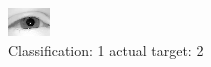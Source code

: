 \begin{figure}[h!]
\begin{center}
\includegraphics[width=0.60\columnwidth]{figures/ID2226_class_1_target_2.png}
\end{center}
\caption{ Classification: 1 actual target: 2}
\label{fig:ID2226_class_1_target_2}
\end{figure}
